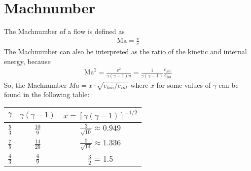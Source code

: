 \documentclass[a4paper,
					12pt,
					twoside,
					openright
					]{book}
\newcommand{\lrb}[1]{{ \left[ #1 \right] }}
\begin{document}
\section{Machnumber}
The Machnumber of a flow is defined as
\begin{align}
\text{Ma}=\frac{v}{c}
\end{align}
The Machnumber can also be interpreted as the ratio of the kinetic and internal 
energy, because
\begin{align}
\text{Ma}^2=\frac{v^2}{\gamma(\gamma-1) u}=\frac{1}{\gamma(\gamma-1)}\frac{e_{kin}}{e_{int}}
\end{align}
So, the Machnumber $Ma = x \cdot \sqrt{e_{kin}/e_{int}}$ where $x$ for some 
values of $\gamma$ can be found in the following table:  
\begin{center}
\begin{tabular}{ccc}
$\gamma$ & $\gamma(\gamma-1)$ & $x = \lrb{\gamma(\gamma-1)}^{-1/2}$ \\ 
\hline
\hline
$\frac{5}{3}$ & $\frac{10}{9}$ & $\frac{3}{\sqrt{10}}\approx 0.949$ \\  
$\frac{7}{5}$ & $\frac{14}{25}$ & $\frac{5}{\sqrt{14}}\approx 1.336$ \\  
$\frac{4}{3}$ & $\frac{4}{9}$ &  $\frac{3}{2}$ = 1.5\\ 
\hline 
\end{tabular}
\end{center} 
\end{document}
